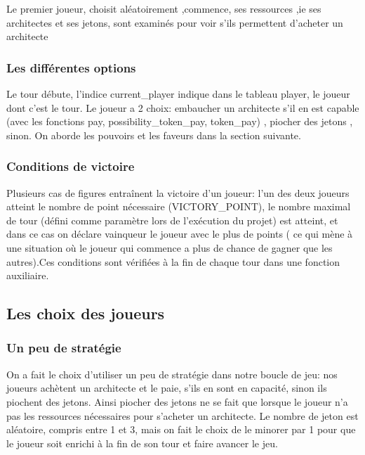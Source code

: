 \documentclass{article}
\begin{document}
      \vspace{1em} Le premier joueur, choisit aléatoirement ,commence, ses ressources ,ie ses architectes et ses jetons, sont examinés pour voir s'ils permettent d'acheter un architecte
    \subsubsection{Les différentes options}
    \hspace{1em} Le tour débute, l'indice current\_player indique dans le tableau player, le joueur dont c'est le tour. Le joueur a 2 choix: embaucher un architecte s'il en est capable (avec les fonctions pay, possibility\_token\_pay, token\_pay) , piocher des jetons , sinon. On aborde les pouvoirs et les faveurs dans la section suivante.

    \subsubsection{Conditions de victoire}
    \hspace{1em} Plusieurs cas de figures entraînent la victoire d'un joueur: l'un des deux joueurs atteint le nombre de point nécessaire (VICTORY\_POINT), le nombre maximal de tour (défini comme paramètre lors de l'exécution du projet) est atteint, et dans ce cas on déclare vainqueur le joueur avec le plus de points ( ce qui mène à une situation où le joueur qui commence a plus de chance de gagner que les autres).Ces conditions sont vérifiées à la fin de chaque tour dans une fonction auxiliaire.
    \subsection{Les choix des joueurs}
        \subsubsection{Un peu de stratégie} %
        \hspace{1em} On a fait le choix d'utiliser un peu de stratégie dans notre boucle de jeu: nos joueurs achètent un architecte et le paie, s'ils en sont en capacité, sinon ils piochent des jetons. Ainsi piocher des jetons ne se fait que lorsque le joueur n'a pas les ressources nécessaires pour s'acheter un architecte. Le nombre de jeton est aléatoire, compris entre 1 et 3, mais on fait le choix de le minorer par 1 pour que le joueur soit enrichi à la fin de son tour et faire avancer le jeu. 
\end{document}
